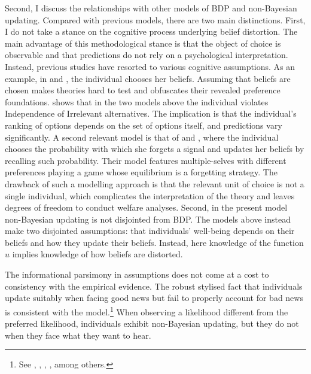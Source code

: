 Second, I discuss the relationships with other models of BDP and non-Bayesian updating. Compared with previous models, there are two main distinctions. First, I do not take a stance on the cognitive process underlying belief distortion. The main advantage of this methodological stance is that the object of choice is observable and that predictions do not rely on a psychological interpretation. Instead, previous studies have resorted to various cognitive assumptions. As an example, in \cite{brunnermeierOptimalExpectations2005} and \cite{koszegiEgoUtilityOverconfidence2006}, the individual chooses her beliefs. Assuming that beliefs are chosen makes theories hard to test and obfuscates their revealed preference foundations. \cite{spieglerTwoPointsView2008} shows that in the two models above the individual violates Independence of Irrelevant alternatives. The implication is that the individual's ranking of options depends on the set of options itself, and predictions vary significantly. A second relevant model is that of \cite{benabouEconomicsMotivatedBeliefs2015} and \cite{benabou2016mindful}, where the individual chooses the probability with which she forgets a signal and updates her beliefs by recalling such probability. Their model features multiple-selves with different preferences playing a game whose equilibrium is a forgetting strategy. The drawback of such a modelling approach is that the relevant unit of choice is not a single individual, which complicates the interpretation of the theory and leaves degrees of freedom to conduct welfare analyses. Second, in the present model non-Bayesian updating is not disjointed from BDP. The models above instead make two disjointed assumptions: that individuals' well-being depends on their beliefs and how they update their beliefs. Instead, here knowledge of the function \( u \) implies knowledge of how beliefs are distorted.

The informational parsimony in assumptions does not come at a cost to consistency with the empirical evidence. The robust stylised fact that individuals update suitably when facing good news but fail to properly account for bad news is consistent with the model.\footnote{See \cite{eilGoodNewsbadNews2011}, \cite{garrettOptimisticUpdateBias2017}, \cite{mobiusManagingSelfConfidenceTheory2022}, \cite{drobnerMotivatedBeliefUpdating2024}, among others.} When observing a likelihood different from the preferred likelihood, individuals exhibit non-Bayesian updating, but they do not when they face what they want to hear.

